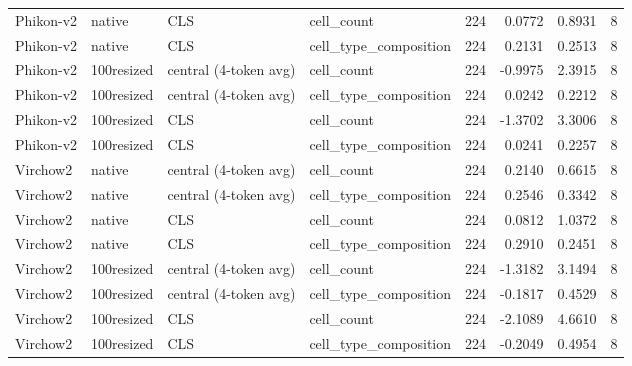 \begin{table}
\begin{tabular}{llllrrrr}
Phikon-v2 & native & CLS & cell_count & 224 & 0.0772 & 0.8931 & 8 \\
Phikon-v2 & native & CLS & cell_type_composition & 224 & 0.2131 & 0.2513 & 8 \\
Phikon-v2 & 100resized & central (4-token avg) & cell_count & 224 & -0.9975 & 2.3915 & 8 \\
Phikon-v2 & 100resized & central (4-token avg) & cell_type_composition & 224 & 0.0242 & 0.2212 & 8 \\
Phikon-v2 & 100resized & CLS & cell_count & 224 & -1.3702 & 3.3006 & 8 \\
Phikon-v2 & 100resized & CLS & cell_type_composition & 224 & 0.0241 & 0.2257 & 8 \\
Virchow2 & native & central (4-token avg) & cell_count & 224 & 0.2140 & 0.6615 & 8 \\
Virchow2 & native & central (4-token avg) & cell_type_composition & 224 & 0.2546 & 0.3342 & 8 \\
Virchow2 & native & CLS & cell_count & 224 & 0.0812 & 1.0372 & 8 \\
Virchow2 & native & CLS & cell_type_composition & 224 & 0.2910 & 0.2451 & 8 \\
Virchow2 & 100resized & central (4-token avg) & cell_count & 224 & -1.3182 & 3.1494 & 8 \\
Virchow2 & 100resized & central (4-token avg) & cell_type_composition & 224 & -0.1817 & 0.4529 & 8 \\
Virchow2 & 100resized & CLS & cell_count & 224 & -2.1089 & 4.6610 & 8 \\
Virchow2 & 100resized & CLS & cell_type_composition & 224 & -0.2049 & 0.4954 & 8 \\
\bottomrule
\end{tabular}
\end{table}
